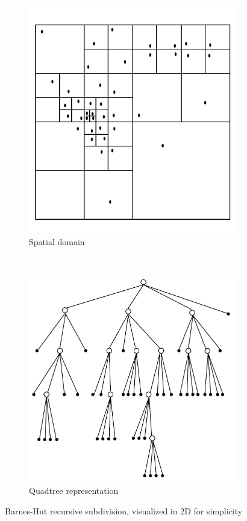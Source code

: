 \begin{figure}[!h]
    \centering
    \begin{subfigure}[b]{0.4\textwidth}
        \includegraphics[width=\textwidth]{Theory/Figs/SpatialBarnesHut.png}
        \caption{Spatial domain}
    \end{subfigure}
    ~ 
    \begin{subfigure}[b]{0.4\textwidth}
        \includegraphics[width=\textwidth]{Theory/Figs/TreelBarnesHut.png}
        \caption{Quadtree representation}
    \end{subfigure}
    \caption{Barnes-Hut recursive subdivision, visualized in 2D for simplicity}
    \label{fig:BarnesHutTree}
\end{figure}


